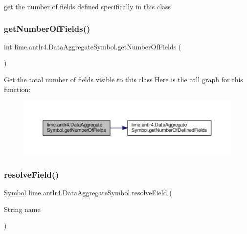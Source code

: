 get the number of fields defined specifically in this class \mbox{\label{classlime_1_1antlr4_1_1DataAggregateSymbol_a12600a8ff3a06f489aa27ee91c9217bd}} 
\subsubsection{\texorpdfstring{get\+Number\+Of\+Fields()}{getNumberOfFields()}}
{\footnotesize\ttfamily int lime.\+antlr4.\+Data\+Aggregate\+Symbol.\+get\+Number\+Of\+Fields (\begin{DoxyParamCaption}{ }\end{DoxyParamCaption})}

Get the total number of fields visible to this class Here is the call graph for this function\+:
\nopagebreak
\begin{figure}[H]
\begin{center}
\leavevmode
\includegraphics[width=350pt]{classlime_1_1antlr4_1_1DataAggregateSymbol_a12600a8ff3a06f489aa27ee91c9217bd_cgraph}
\end{center}
\end{figure}
\mbox{\label{classlime_1_1antlr4_1_1DataAggregateSymbol_a0a1d90d6144f8c30e7733af041cc46f2}} 
\subsubsection{\texorpdfstring{resolve\+Field()}{resolveField()}}
{\footnotesize\ttfamily \hyperlink{interfacelime_1_1antlr4_1_1Symbol}{Symbol} lime.\+antlr4.\+Data\+Aggregate\+Symbol.\+resolve\+Field (\begin{DoxyParamCaption}\item[{String}]{name }\end{DoxyParamCaption})}

